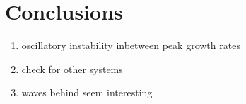 \chapter{Conclusions}

\begin{enumerate}
\item oscillatory instability inbetween peak growth rates
\item check for other systems
\item waves behind seem interesting 
\end{enumerate}



